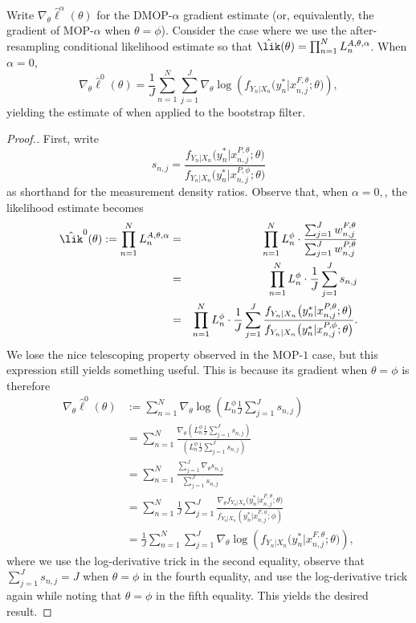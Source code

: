 \begin{lem}
\label{lem:mop-0-formula}
Write $\nabla_\theta \hat\ell^\alpha(\theta)$ for the DMOP-$\alpha$ gradient estimate (or, equivalently, the gradient of MOP-$\alpha$ when $\theta=\phi$).
Consider the case where we use the after-resampling conditional likelihood estimate so that $\hat\lik(\theta) = \prod_{n=1}^N L_n^{A, \theta, \alpha}$.
When $\alpha=0$,
    \begin{equation}
        \nabla_\theta \hat\ell^0(\theta) 
        = \frac{1}{J} \sum_{n=1}^N \sum_{j=1}^J \nabla_\theta \log\left(f_{Y_n|X_{n}}\big(y_n^*|x_{n,j}^{F, \theta}; \theta\big)\right),
    \end{equation}
    yielding the estimate of \cite{naesseth18} when applied to the bootstrap filter. 
\end{lem}
\begin{proof}[Proof.]
First, write
\begin{equation}
s_{n,j} = \frac{f_{Y_n|X_n}\big(y_n^*|x_{n,j}^{P, \theta};\theta\big)}{f_{Y_n|X_n}\big(y_n^*|x_{n,j}^{P, \phi};\theta\big)}
\end{equation}
as shorthand for the measurement density ratios. 
Observe that, when $\alpha=0,$, the likelihood estimate becomes
\begin{eqnarray}
    \hat{\lik}^0(\theta) := \prod_{n=1}^N L_n^{A, \theta, \alpha} &=& \prod_{n=1}^N L_n^\phi \cdot \frac{\sum_{j=1}^J w_{n,j}^{F,\theta}}{\sum_{j=1}^J w_{n,j}^{P,\theta}} 
    \\
    &=& \prod_{n=1}^N L_n^\phi \cdot \frac{1}{J}\sum_{j=1}^J s_{n,j} 
    \\
    &=& \prod_{n=1}^N L_n^\phi \cdot \frac{1}{J}\sum_{j=1}^J \frac{f_{Y_n|X_n}\big(y_n^*|x_{n,j}^{P, \theta};\theta\big)}{f_{Y_n|X_n}\big(y_n^*|x_{n,j}^{P, \phi};\theta\big)}.
\end{eqnarray}
We lose the nice telescoping property observed in the MOP-$1$ case, but this expression still yields something useful. 
This is because its gradient when $\theta=\phi$ is therefore 
\begin{align}
    \nabla_\theta \hat{\ell}^0(\theta) &:= \sum_{n=1}^N \nabla_\theta \log\left(L_n^\phi \frac{1}{J} \sum_{j=1}^J s_{n,j}\right) \\
    &= \sum_{n=1}^N \frac{\nabla_\theta \left(L_n^\phi \frac{1}{J} \sum_{j=1}^J s_{n,j}\right)}{\left(L_n^\phi \frac{1}{J} \sum_{j=1}^J s_{n,j}\right)} \\
    &= \sum_{n=1}^N \frac{\sum_{j=1}^J \nabla_\theta s_{n,j}}{\sum_{j=1}^J s_{n,j}} \\
    &= \sum_{n=1}^N \frac{1}{J} \sum_{j=1}^J \frac{\nabla_\theta f_{Y_n|X_{n}}\big(y_n^*|x_{n,j}^{F, \theta}; \theta\big)}{f_{Y_n|X_{n}}(y_n^*|x_{n,j}^{F, \phi}; \phi)} \\
    &= \frac{1}{J} \sum_{n=1}^N \sum_{j=1}^J \nabla_\theta \log\left(f_{Y_n|X_{n}}\big(y_n^*|x_{n,j}^{F, \theta}; \theta\big)\right),
\end{align}
where we use the log-derivative trick in the second equality, observe that $\sum_{j=1}^J s_{n,j} = J$ when $\theta=\phi$ in the fourth equality, and use the log-derivative trick again while noting that $\theta=\phi$ in the fifth equality. This yields the desired result.
\end{proof}



